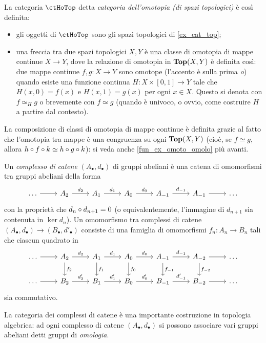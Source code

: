 \begin{example}\label{ex_cat_hotop}
	La categoria $\ctHoTop$ detta \emph{categoria dell'omotopia (di spazi topologici)} è così definita:  
	\begin{itemize}
		\item gli oggetti di $\ctHoTop$ sono gli spazi topologici di \ref{ex_cat_top};
		\item una freccia tra due spazi topologici $X,Y$ è una classe di omotopia di mappe continue $X\to Y$, dove la relazione di omotopia in $\mathbf{Top}(X,Y)$ è definita così: due mappe continue $f,g : X\to Y$ sono omotope (l'accento è sulla prima \emph{o}) quando esiste una funzione continua $H : X \times [0,1] \to Y$ tale che $H(x,0) = f(x)$ e $H(x,1)=g(x)$ per ogni $x\in X$. Questo si denota con $f\simeq_H g$ o brevemente con $f\simeq g$ (quando è univoco, o ovvio, come costruire $H$ a partire dal contesto).
	\end{itemize}
	La composizione di classi di omotopia di mappe continue è definita grazie al fatto che l'omotopia tra mappe è una congruenza su ogni $\mathbf{Top}(X,Y)$ (cioè, se $f\simeq g$, allora $h\circ f\circ k\simeq h\circ g\circ k$): si veda anche \ref{fun_ex_omoto_omolo} più avanti.
\end{example}
\begin{example}
	Un \emph{complesso di catene} $(A_\bullet, d_\bullet)$ di gruppi abeliani è una catena di omomorfismi tra gruppi abeliani della forma 
	\[\begin{tikzcd}
		\dots \ar[r] & A_2 \ar[r, "d_2"] & A_1  \ar[r, "d_1"] & A_0 \ar[r, "d_0"] & A_{-1} \ar[r, "d_{-1}"] & A_{-1} \ar[r] & \dots
	\end{tikzcd}\]
	con la proprietà che $d_n\circ d_{n+1}=0$ (o equivalentemente, l'immagine di $d_{n+1}$ sia contenuta in $\ker d_n$). Un omomorfismo tra complessi di catene $(A_\bullet,d_\bullet) \to (B_\bullet,d'_\bullet)$ consiste di una famiglia di omomorfismi $f_n : A_n \to B_n$ tali che ciascun quadrato in 
	\[\begin{tikzcd}
    \dots \ar[r] & A_2 \ar[d,"f_2"]\ar[r, "d_2"] & A_1 \ar[d,"f_1"] \ar[r, "d_1"] & A_0 \ar[d,"f_0"]\ar[r, "d_0"] & A_{-1} \ar[d,"f_{-1}"]\ar[r, "d_{-1}"] & A_{-2} \ar[d, "f_{-2}"]\ar[r] & \dots\\
		\dots \ar[r] & B_2 \ar[r, "d_2'"] & B_1  \ar[r, "d_1'"] & B_0 \ar[r, "d_0'"] & B_{-1} \ar[r, "d_{-1}'"] & B_{-2} \ar[r] & \dots
	\end{tikzcd}\]
	sia commutativo.

La categoria dei complessi di catene è una importante costruzione in topologia algebrica: ad ogni complesso di catene $(A_\bullet, d_\bullet)$ si possono associare vari gruppi abeliani detti gruppi di \emph{omologia}.
\end{example}
